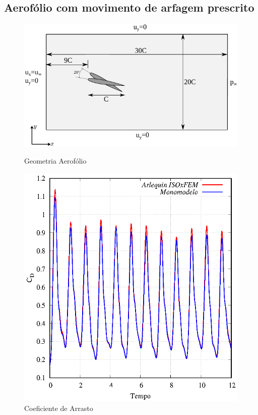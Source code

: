 \documentclass[tese_patricia]{subfiles}
\begin{document}
\subsection{Aerofólio com movimento de arfagem prescrito}


\begin{figure}[htb!]
	\centering 
	{\includegraphics[scale=1.0,trim=0cm 0cm 0cm 0cm, clip=true]{Imagens/Cap6/aerofolioMov.pdf}}	
	\caption{Geometria Aerofólio}
	\label{fig:AerofolioMoving}
\end{figure}



\begin{figure}[htb!]
	\centering 
	\includegraphics[scale=1.0,trim=0cm 0cm 0cm 0cm, clip=true]{Imagens/Cap6/DragMov.eps}	
	\caption{Coeficiente de Arrasto}
	\label{fig:AeroDragMov}
\end{figure}
\end{document}
